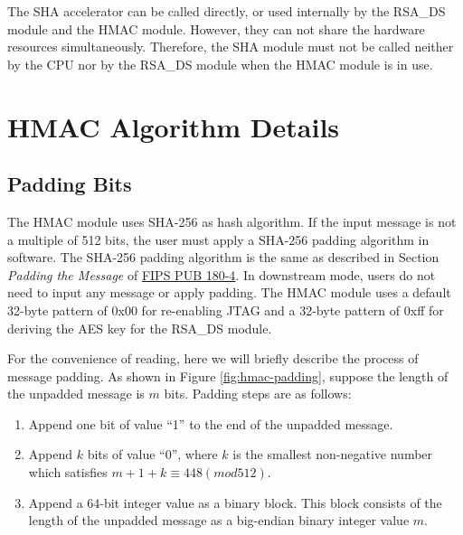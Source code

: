 \documentclass[main\_\_EN.tex]{subfiles}
\begin{document}
\begin{tiplisting}
  \label{hmac_tips_2}
    The SHA accelerator can be called directly, or used internally by the RSA\_DS module and the HMAC module. However, they can not share the hardware resources simultaneously. Therefore, the SHA module must not be called neither by the CPU nor by the RSA\_DS module when the HMAC module is in use.
\end{tiplisting}

\section{HMAC Algorithm Details}

\subsection{Padding Bits}
\label{sec:hmac-padding}

The HMAC module uses SHA-256 as hash algorithm. If the input message is not a multiple of 512 bits, the user must apply a SHA-256 padding algorithm in software. The SHA-256 padding algorithm is the same as described in Section \textit{Padding the Message} of \href{https://nvlpubs.nist.gov/nistpubs/FIPS/NIST.FIPS.180-4.pdf}{FIPS PUB 180-4}. In downstream mode, users do not need to input any message or apply padding. The HMAC module uses a default 32-byte pattern of 0x00 for re-enabling JTAG and a 32-byte pattern of 0xff for deriving the AES key for the RSA\_DS module.

For the convenience of reading, here we will briefly describe the process of message padding. As shown in Figure \ref{fig:hmac-padding}, suppose the length of the unpadded message is \begin{math}m\end{math} bits. Padding steps are as follows:

\begin{enumerate}
    \item Append one bit of value “1” to the end of the unpadded message.
    \item Append $k$ bits of value “0”, where \begin{math}k\end{math} is the smallest non-negative number which satisfies $m + 1 + k {\equiv} 448 (mod 512)$.
    \item Append a 64-bit integer value as a binary block. This block consists of the length of the unpadded message as a big-endian binary integer value \begin{math}m\end{math}.
\end{enumerate}
\end{document}
